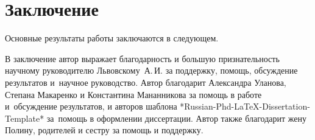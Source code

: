 \chapter*{Заключение}                       %


Основные результаты работы заключаются в следующем.


В заключение автор выражает благодарность и большую признательность научному руководителю
Львовскому~А.\,И. за поддержку, помощь, обсуждение результатов и~научное
руководство. Автор благодарит Александра Уланова, Степана Макаренко и Константина Мананникова за помощь в работе и~обсуждение результатов, и авторов шаблона
*Russian-Phd-LaTeX-Dissertation-Template* за~помощь в оформлении
диссертации. Автор также благодарит жену Полину, родителей и сестру за помощь и поддержку. 
